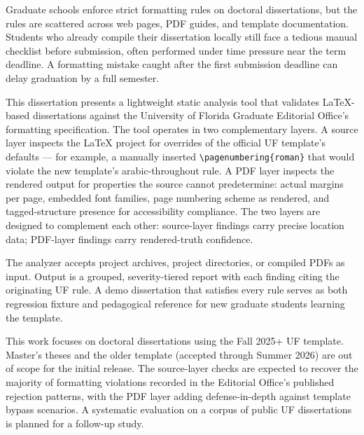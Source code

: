 
Graduate schools enforce strict formatting rules on doctoral
dissertations, but the rules are scattered across web pages, PDF
guides, and template documentation. Students who already compile their
dissertation locally still face a tedious manual checklist before
submission, often performed under time pressure near the term deadline.
A formatting mistake caught after the first submission deadline can
delay graduation by a full semester.

This dissertation presents a lightweight static analysis tool that
validates LaTeX-based dissertations against the University of Florida
Graduate Editorial Office's formatting specification. The tool operates
in two complementary layers. A source layer inspects the LaTeX project
for overrides of the official UF template's defaults — for example, a
manually inserted \texttt{\textbackslash pagenumbering\{roman\}} that
would violate the new template's arabic-throughout rule. A PDF layer
inspects the rendered output for properties the source cannot
predetermine: actual margins per page, embedded font families, page
numbering scheme as rendered, and tagged-structure presence for
accessibility compliance. The two layers are designed to complement
each other: source-layer findings carry precise location data; PDF-layer
findings carry rendered-truth confidence.

The analyzer accepts project archives, project directories, or compiled
PDFs as input. Output is a grouped, severity-tiered report with each
finding citing the originating UF rule. A demo dissertation that
satisfies every rule serves as both regression fixture and pedagogical
reference for new graduate students learning the template.

This work focuses on doctoral dissertations using the Fall 2025+ UF
template. Master's theses and the older template (accepted through
Summer 2026) are out of scope for the initial release. The source-layer
checks are expected to recover the majority of formatting violations
recorded in the Editorial Office's published rejection patterns, with
the PDF layer adding defense-in-depth against template bypass scenarios.
A systematic evaluation on a corpus of public UF dissertations is
planned for a follow-up study.

